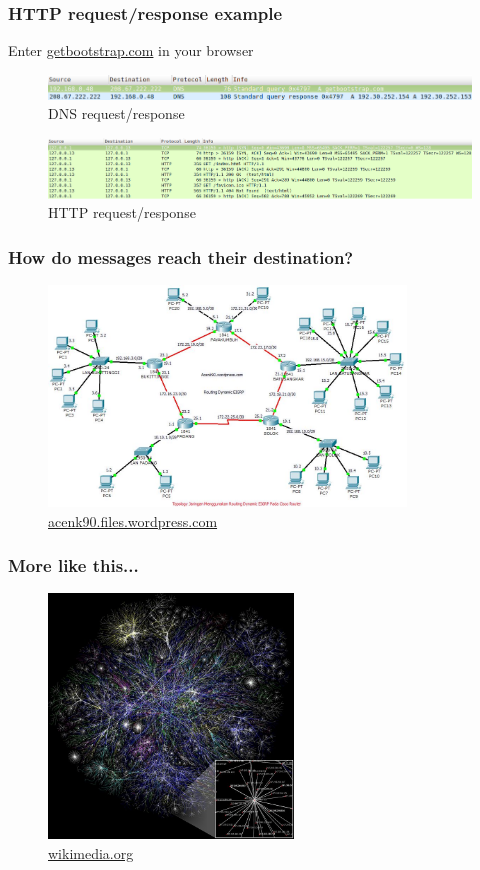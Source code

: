 \begin{frame}
    \frametitle{HTTP request/response example}
      Enter \color{blue}\href{http://getbootstrap.com}{getbootstrap.com} \color{black} in your browser\pause
      \begin{figure}
    \includegraphics[width=11.5cm]{./imgs/dns-req.png}
  \caption{DNS request/response}
      \end{figure}
      \pause
      \begin{figure}
    \includegraphics[trim = 0 0 100mm 0, clip, width=11.5cm]{./imgs/http-req.png}
  \caption{HTTP request/response}
      \end{figure}
  \end{frame}
    \begin{frame}
    \frametitle{How do messages reach their destination?}
      \begin{figure}
    \includegraphics[width=9.5cm]{./imgs/routing.jpg}
  \caption{\color{blue}\href{http://acenk90.files.wordpress.com}{acenk90.files.wordpress.com}}
  \label{fig:routing}
      \end{figure}
  \end{frame}
    \begin{frame}
    \frametitle{More like this...}
      \begin{figure}
    \includegraphics[height=6.5cm]{./imgs/map.jpg}
  \caption{\color{blue}\href{https://upload.wikimedia.org/wikipedia/commons/thumb/d/d2/Internet_map_1024.jpg/768px-Internet_map_1024.jpg}{wikimedia.org}}
  \label{fig:map}
      \end{figure}
  \end{frame}

